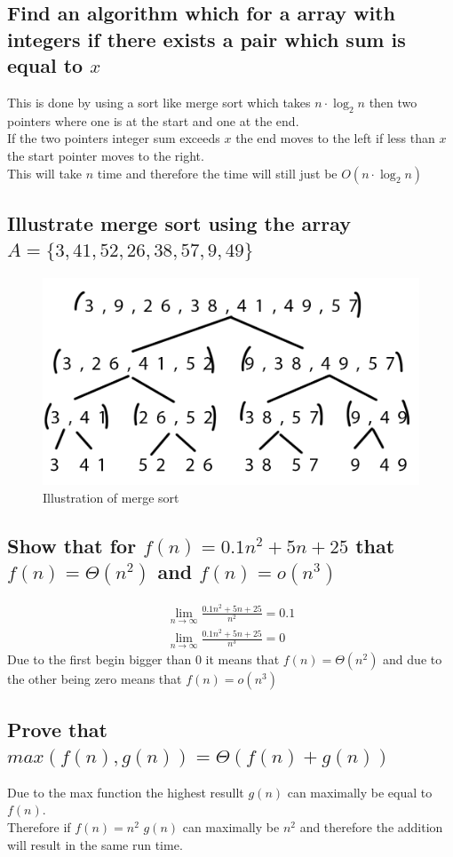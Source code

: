 \documentclass[12pt, a4paper]{article}
\begin{document}
			\subsection{Find an algorithm which for a array with integers if there exists a pair which sum is equal to $x$}
				This is done by using a sort like merge sort which takes $n\cdot \log_2n$ then two pointers where one is at the start and one at the end.\\				
				If the two pointers integer sum exceeds $x$ the end moves to the left if less than $x$ the start pointer moves to the right.\\
				This will take $n$ time and therefore the time will still just be $O(n\cdot \log_2n)$
			\subsection{Illustrate merge sort using the array $A=\{3,41,52,26,38,57,9,49\}$}
				\begin{figure}[h!]
					\includegraphics[width=\linewidth]{assets/week6Exercise1.png}
					\caption{Illustration of merge sort}
				\end{figure}
			\subsection{Show that for $f(n)=0.1n^2+5n+25$ that $f(n)=\Theta(n^2)$ and $f(n)=o(n^3)$}
				\begin{align*}
					\lim\limits_{n\rightarrow \infty}\frac{0.1n^2+5n+25}{n^2}=0.1\\
					\lim\limits_{n\rightarrow \infty}\frac{0.1n^2+5n+25}{n^3}=0
				\end{align*}
				Due to the first begin bigger than 0 it means that $f(n)=\Theta(n^2)$ and due to the other being zero means that $f(n)=o(n^3)$
			\subsection{Prove that $max(f(n),g(n))=\Theta(f(n)+g(n))$}
				Due to the max function the highest resullt $g(n)$ can maximally be equal to $f(n)$.\\
				Therefore if $f(n)=n^2$ $g(n)$ can maximally be $n^2$ and therefore the addition will result in the same run time.
\end{document}
